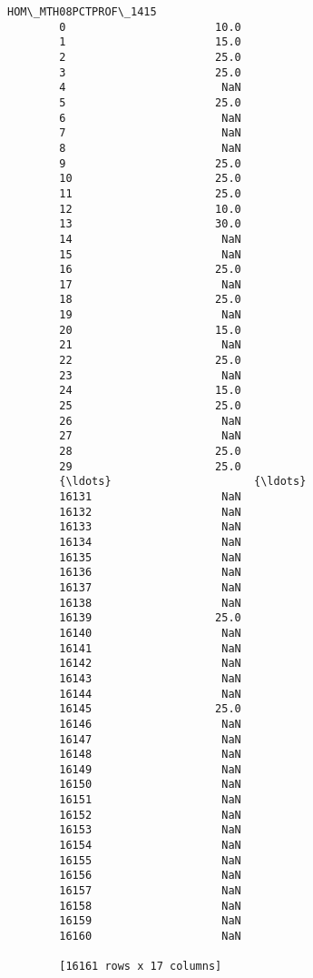 \documentclass[11pt]{article}
\begin{document}
\begin{Verbatim}[commandchars=\\\{\}]
               HOM\_MTH08PCTPROF\_1415  
        0                       10.0  
        1                       15.0  
        2                       25.0  
        3                       25.0  
        4                        NaN  
        5                       25.0  
        6                        NaN  
        7                        NaN  
        8                        NaN  
        9                       25.0  
        10                      25.0  
        11                      25.0  
        12                      10.0  
        13                      30.0  
        14                       NaN  
        15                       NaN  
        16                      25.0  
        17                       NaN  
        18                      25.0  
        19                       NaN  
        20                      15.0  
        21                       NaN  
        22                      25.0  
        23                       NaN  
        24                      15.0  
        25                      25.0  
        26                       NaN  
        27                       NaN  
        28                      25.0  
        29                      25.0  
        {\ldots}                      {\ldots}  
        16131                    NaN  
        16132                    NaN  
        16133                    NaN  
        16134                    NaN  
        16135                    NaN  
        16136                    NaN  
        16137                    NaN  
        16138                    NaN  
        16139                   25.0  
        16140                    NaN  
        16141                    NaN  
        16142                    NaN  
        16143                    NaN  
        16144                    NaN  
        16145                   25.0  
        16146                    NaN  
        16147                    NaN  
        16148                    NaN  
        16149                    NaN  
        16150                    NaN  
        16151                    NaN  
        16152                    NaN  
        16153                    NaN  
        16154                    NaN  
        16155                    NaN  
        16156                    NaN  
        16157                    NaN  
        16158                    NaN  
        16159                    NaN  
        16160                    NaN  
        
        [16161 rows x 17 columns]
\end{Verbatim}
            
\end{document}
